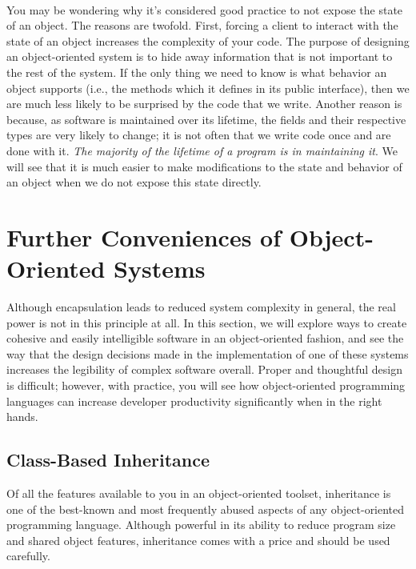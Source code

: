 \documentclass{article}
\begin{document}
\paragraph{}
You may be wondering why it’s considered good practice to not expose the state
of an object. The reasons are twofold. First, forcing a client to interact with
the state of an object increases the complexity of your code. The purpose of
designing an object-oriented system is to hide away information that is not
important to the rest of the system. If the only thing we need to know is what
behavior an object supports (i.e., the methods which it defines in its public
interface), then we are much less likely to be surprised by the code that we
write. Another reason is because, as software is maintained over its lifetime,
the fields and their respective types are very likely to change; it is not often
that we write code once and are done with it. \textit{The majority of the
lifetime of a
program is in maintaining it}. We will see that it is much easier to make
modifications to the state and behavior of an object when we do not expose this
state directly.

\section{Further Conveniences of Object-Oriented Systems}
Although encapsulation leads to reduced system complexity in general, the real
power is not in this principle at all. In this section, we will explore ways to
create cohesive and easily intelligible software in an object-oriented fashion,
and see the way that the design decisions made in the implementation of one of
these systems increases the legibility of complex software overall. Proper and
thoughtful design is difficult; however, with practice, you will see how
object-oriented programming languages can increase developer productivity
significantly when in the right hands.
\subsection{Class-Based Inheritance}
Of all the features available to you in an object-oriented toolset, inheritance
is one of the best-known and most frequently abused aspects of any
object-oriented programming language. Although powerful in its ability to reduce
program size and shared object features, inheritance comes with a price and
should be used carefully.
\end{document}

